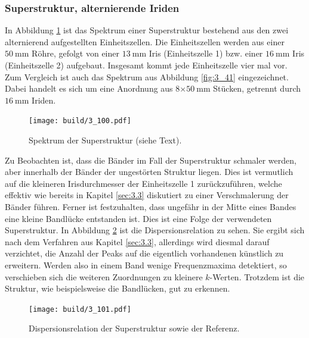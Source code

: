 \subsubsection{Superstruktur, alternierende Iriden}
In Abbildung \ref{fig:3_100} ist das Spektrum einer Superstruktur bestehend aus den zwei alternierend aufgestellten Einheitszellen. Die Einheitszellen werden aus einer $\SI{50}{\milli\meter}$ Röhre, gefolgt von einer $\SI{13}{\milli\meter}$ Iris (Einheitszelle 1) bzw. einer $\SI{16}{\milli\meter}$ Iris (Einheitszelle 2) aufgebaut. Insgesamt kommt jede Einheitszelle vier mal vor. Zum Vergleich ist auch das Spektrum aus Abbildung \ref{fig:3_41} eingezeichnet. Dabei handelt es sich um eine Anordnung aus 8$\times\SI{50}{\milli\meter}$ Stücken, getrennt durch $\SI{16}{\milli\meter}$ Iriden.
\begin{figure}
  \centering  \texttt{[image: build/3\_100.pdf]}  \caption{Spektrum der Superstruktur (siehe Text).} \label{fig:3_100}
\end{figure}
Zu Beobachten ist, dass die Bänder im Fall der Superstruktur schmaler werden, aber innerhalb der Bänder der ungestörten Struktur liegen. Dies ist vermutlich auf die kleineren Irisdurchmesser der Einheitszelle 1 zurückzuführen, welche effektiv wie bereits in Kapitel \ref{sec:3.3} diskutiert zu einer Verschmalerung der Bänder führen. Ferner ist festzuhalten, dass ungefähr in der Mitte eines Bandes eine kleine Bandlücke entstanden ist. Dies ist eine Folge der verwendeten Superstruktur.
In Abbildung \ref{fig:3_101} ist die Dispersionsrelation zu sehen. Sie ergibt sich nach dem Verfahren aus Kapitel \ref{sec:3.3}, allerdings wird diesmal darauf verzichtet, die Anzahl der Peaks auf die eigentlich vorhandenen künstlich zu erweitern. Werden also in einem Band wenige Frequenzmaxima detektiert, so verschieben sich die weiteren Zuordnungen zu kleinere $k$-Werten. Trotzdem ist die Struktur, wie beispielsweise die Bandlücken, gut zu erkennen.
\begin{figure}
  \centering  \texttt{[image: build/3\_101.pdf]}  \caption{Dispersionsrelation der Superstruktur sowie der Referenz.} \label{fig:3_101}
\end{figure}

